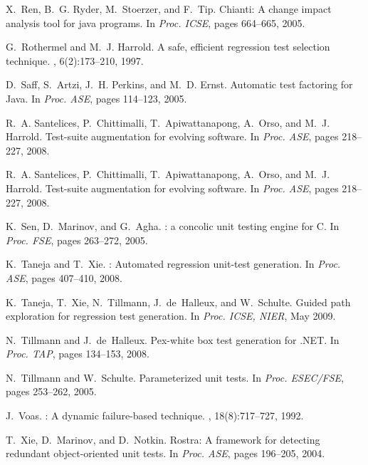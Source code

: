 \documentclass{llncs}
\begin{document}
{\begin{thebibliography}{10}
\begin{scriptsize}
X.~Ren, B.~G. Ryder, M.~Stoerzer, and F.~Tip.
\newblock Chianti: A change impact analysis tool for java programs.
\newblock In {\em Proc. ICSE}, pages 664--665, 2005.

G.~Rothermel and M.~J. Harrold.
\newblock A safe, efficient regression test selection technique.
, 6(2):173--210, 1997.

D.~Saff, S.~Artzi, J.~H. Perkins, and M.~D. Ernst.
\newblock Automatic test factoring for {Java}.
\newblock In {\em Proc. ASE}, pages 114--123, 2005.

R.~A. Santelices, P.~Chittimalli, T.~Apiwattanapong, A.~Orso, and M.~J.
  Harrold.
\newblock Test-suite augmentation for evolving software.
\newblock In {\em Proc. ASE}, pages 218--227, 2008.

R.~A. Santelices, P.~Chittimalli, T.~Apiwattanapong, A.~Orso, and M.~J.
  Harrold.
\newblock Test-suite augmentation for evolving software.
\newblock In {\em Proc. ASE}, pages 218--227, 2008.

K.~Sen, D.~Marinov, and G.~Agha.
: a concolic unit testing engine for {C}.
\newblock In {\em Proc. FSE}, pages 263--272, 2005.

K.~Taneja and T.~Xie.
: Automated regression unit-test generation.
\newblock In {\em Proc. ASE}, pages 407--410, 2008.

K.~Taneja, T.~Xie, N.~Tillmann, J.~de~Halleux, and W.~Schulte.
\newblock Guided path exploration for regression test generation.
\newblock In {\em Proc. ICSE, NIER}, May 2009.

N.~Tillmann and J.~de~Halleux.
\newblock Pex-white box test generation for {.{N}{E}{T}}.
\newblock In {\em Proc. TAP}, pages 134--153, 2008.

N.~Tillmann and W.~Schulte.
\newblock Parameterized unit tests.
\newblock In {\em Proc. ESEC/FSE}, pages 253--262, 2005.

J.~Voas.
: A dynamic failure-based technique.
, 18(8):717--727, 1992.

T.~Xie, D.~Marinov, and D.~Notkin.
\newblock Rostra: A framework for detecting redundant object-oriented unit
  tests.
\newblock In {\em Proc. ASE}, pages 196--205, 2004.


\end{scriptsize}
\end{thebibliography}}
\end{document}
